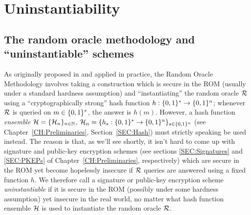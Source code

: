 \chapter{Uninstantiability}
\label{CH:Uninstantiability}

\section{The random oracle methodology and ``uninstantiable'' schemes}
\label{SEC:Methodology}
As originally proposed in \cite{bellare:rompractical} and applied in practice,
the Random Oracle Methodology involves taking a construction which is secure
in the ROM (usually under a standard hardness assumption) and
``instantiating'' the random oracle $\mathcal{R}$ using a ``cryptographically
strong'' hash function $h: \{0,1\}^{*} \to \{0,1\}^{n}$; whenever $\mathcal{R}$ is queried
on $m \in \{0,1\}^{*}$, the answer is $h(m)$.  However, a hash function {\it
ensemble} $\mathcal{H} = \{\mathcal{H}_n\}_{n \in \mathbb{N}}$, $\mathcal{H}_n = \{h_s : \{0,1\}^{*} \to
\{0,1\}^{n}\}_{s \in \{0,1\}^{n}}$ (see Chapter~\ref{CH:Preliminaries},
Section~\ref{SEC:Hash}) must strictly speaking be used instead. The reason is
that, as we'll see shortly, it isn't hard to come up with signature and
public-key encryption schemes (see sections \ref{SEC:Signatures} and
\ref{SEC:PKEPs} of Chapter~\ref{CH:Preliminaries}, respectively) which are
secure in the ROM yet become hopelessly insecure if $\mathcal{R}$ queries are
answered using a fixed function $h$. We therefore call a signature or
public-key encryption scheme {\it uninstantiable} if it is secure in the ROM
(possibly under some hardness assumption) yet insecure in the real world, no
matter what hash function ensemble $\mathcal{H}$ is used to instantiate the random
oracle $\mathcal{R}$.

